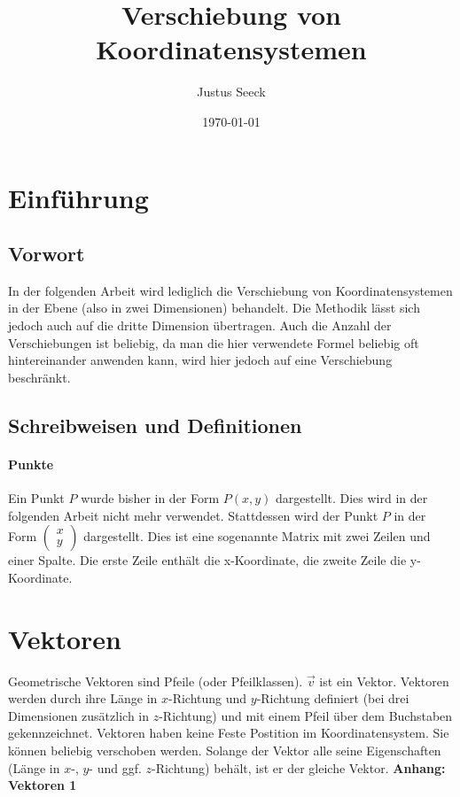 \documentclass{article}
\title{Verschiebung von Koordinatensystemen}
\author{Justus Seeck}
\date{\today}
\newcommand{\m}[1]{\begin{pmatrix}#1\end{pmatrix}}
\begin{document}
    \maketitle

    \tableofcontents

    \newpage

    \section{Einführung}

    \subsection{Vorwort}

    In der folgenden Arbeit wird lediglich die Verschiebung von Koordinatensystemen in der Ebene (also in zwei Dimensionen) behandelt.
    Die Methodik lässt sich jedoch auch auf die dritte Dimension übertragen. Auch die Anzahl der Verschiebungen ist beliebig, da man die
    hier verwendete Formel beliebig oft hintereinander anwenden kann, wird hier jedoch auf eine Verschiebung beschränkt.

    \subsection{Schreibweisen und Definitionen}
    
    \paragraph*{Punkte}

    Ein Punkt $P$ wurde bisher in der Form $P(x,y)$ dargestellt. Dies wird in der folgenden Arbeit nicht mehr verwendet. Stattdessen wird
    der Punkt $P$ in der Form $\m{x \\ y}$ dargestellt. Dies ist eine sogenannte Matrix mit zwei Zeilen und einer Spalte.
    Die erste Zeile enthält die x-Koordinate, die zweite Zeile die y-Koordinate.

    
    \section{Vektoren}

    Geometrische Vektoren sind Pfeile (oder Pfeilklassen). $\vec{v}$ ist ein Vektor.
    Vektoren werden durch ihre Länge in $x$-Richtung und $y$-Richtung definiert
    (bei drei Dimensionen zusätzlich in $z$-Richtung) und mit einem Pfeil über dem Buchstaben gekennzeichnet.
    Vektoren haben keine Feste Postition im Koordinatensystem. Sie können beliebig verschoben werden.
    Solange der Vektor alle seine Eigenschaften (Länge in $x$-, $y$- und ggf. $z$-Richtung) behält,
    ist er der gleiche Vektor. \textbf{Anhang: Vektoren 1}
\end{document}
